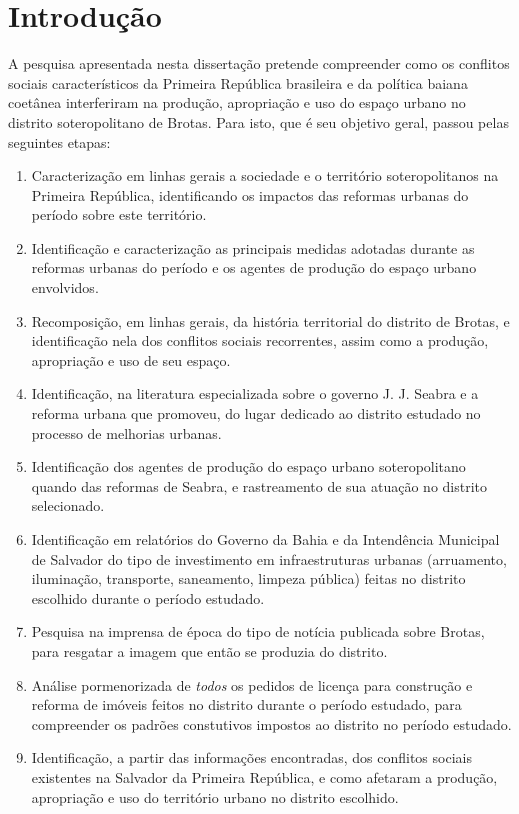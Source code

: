 \chapter[Introdução]{Introdução}\label{ch:intro}

A pesquisa apresentada nesta dissertação pretende compreender como os conflitos sociais característicos da Primeira República brasileira e da política baiana coetânea interferiram na produção, apropriação e uso do espaço urbano no distrito soteropolitano de Brotas. Para isto, que é seu objetivo geral, passou pelas seguintes etapas:

\begin{enumerate}
\item Caracterização em linhas gerais a sociedade e o território soteropolitanos na Primeira República, identificando os impactos das reformas urbanas do período sobre este território.
\item Identificação e caracterização as principais medidas adotadas durante as reformas urbanas do período e os agentes de produção do espaço urbano envolvidos.
\item Recomposição, em linhas gerais, da história territorial do distrito de Brotas, e identificação nela dos conflitos sociais recorrentes, assim como a produção, apropriação e uso de seu espaço.
\item Identificação, na literatura especializada sobre o governo J. J. Seabra e a reforma urbana que promoveu, do lugar dedicado ao distrito estudado no processo de melhorias urbanas.
\item Identificação dos agentes de produção do espaço urbano soteropolitano quando das reformas de Seabra, e rastreamento de sua atuação no distrito selecionado.
\item Identificação em relatórios do Governo da Bahia e da Intendência Municipal de Salvador do tipo de investimento em infraestruturas urbanas (arruamento, iluminação, transporte, saneamento, limpeza pública) feitas no distrito escolhido durante o período estudado.
\item Pesquisa na imprensa de época do tipo de notícia publicada sobre Brotas, para resgatar a imagem que então se produzia do distrito.
\item Análise pormenorizada de \textit{todos} os pedidos de licença para construção e reforma de imóveis feitos no distrito durante o período estudado, para compreender os padrões constutivos impostos ao distrito no período estudado.
\item Identificação, a partir das informações encontradas, dos conflitos sociais existentes na Salvador da Primeira República, e como afetaram a produção, apropriação e uso do território urbano no distrito escolhido.
\end{enumerate}

